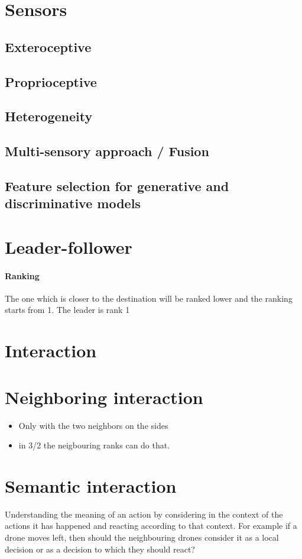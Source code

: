 \documentclass{article}
\begin{document}
	\section{Sensors}
		\subsection{Exteroceptive}
		\subsection{Proprioceptive}
		\subsection{Heterogeneity}
		\subsection{Multi-sensory approach / Fusion}
		\subsection{Feature selection for generative and discriminative models}
	
	\section{Leader-follower}
		\paragraph{Ranking}
		The one which is closer to the destination will be ranked lower and the ranking starts from 1. The leader is rank 1
	
	\section{Interaction}
		\section{Neighboring interaction}
			\begin{itemize}
				\item Only with the two neighbors on the sides
				\item in 3/2 the neigbouring ranks can do that.
			\end{itemize}
		\section{Semantic interaction}
		Understanding the meaning of an action by considering in the context of the actions it has happened and reacting according to that context. For example if a drone moves left, then should the neighbouring drones consider it as a local decision or as a decision to which they should react? 
		
\end{document}
